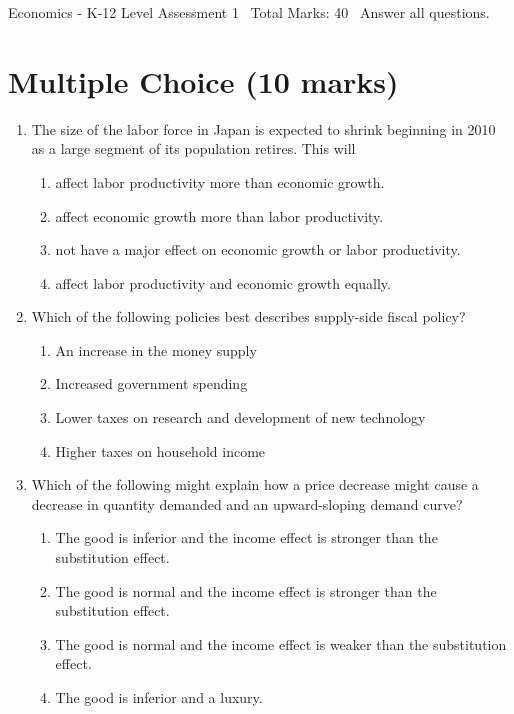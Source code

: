 \documentclass[12pt]{article}
\begin{document}
\begin{center}
Economics - K-12 Level Assessment 1 \
Total Marks: 40 \
Answer all questions.
\end{center}

\section*{Multiple Choice (10 marks)}
\begin{enumerate}[label=\arabic*.]
\item The size of the labor force in Japan is expected to shrink beginning in 2010 as a large
segment of its population retires. This will
\begin{enumerate}[label=(\alph*)]
    \item affect labor productivity more than economic growth.
    \item affect economic growth more than labor productivity.
    \item not have a major effect on economic growth or labor productivity.
    \item affect labor productivity and economic growth equally.
\end{enumerate}
\item Which of the following policies best describes supply-side fiscal policy?
\begin{enumerate}[label=(\alph*)]
    \item An increase in the money supply
    \item Increased government spending
    \item Lower taxes on research and development of new technology
    \item Higher taxes on household income
\end{enumerate}
\item Which of the following might explain how a price decrease might cause a decrease in
quantity demanded and an upward-sloping demand curve?
\begin{enumerate}[label=(\alph*)]
    \item The good is inferior and the income effect is stronger than the substitution effect.
    \item The good is normal and the income effect is stronger than the substitution effect.
    \item The good is normal and the income effect is weaker than the substitution effect.
    \item The good is inferior and a luxury.
\end{enumerate}

\end{enumerate}
\end{document}
